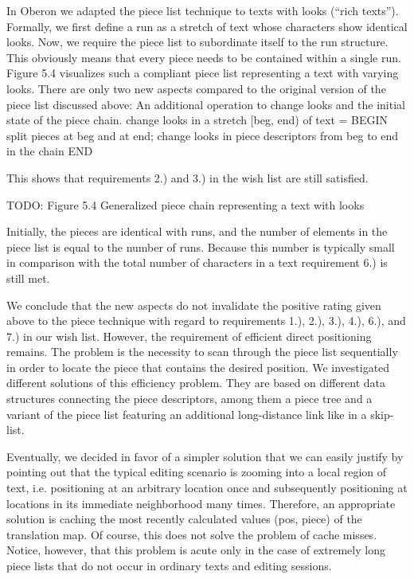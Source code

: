In Oberon we adapted the piece list technique to texts with looks
(``rich texts''). Formally, we first define a run as a stretch of text
whose characters show identical looks. Now, we require the piece list
to subordinate itself to the run structure. This obviously means that
every piece needs to be contained within a single run. Figure 5.4
visualizes such a compliant piece list representing a text with
varying looks. There are only two new aspects compared to the original
version of the piece list discussed above: An additional operation to
change looks and the initial state of the piece chain.
\begintt
change looks in a stretch [beg, end) of text = BEGIN
  split pieces at beg and at end;
  change looks in piece descriptors from beg to end in the chain
END
\endtt

\noindent This shows that requirements 2.) and 3.) in the wish list are still satisfied.

TODO: Figure 5.4 Generalized piece chain representing a text with looks

Initially, the pieces are identical with runs, and the number of elements in the piece list is equal to the number of runs. Because this number is typically small in comparison with the total number of characters in a text requirement 6.) is still met.

We conclude that the new aspects do not invalidate the positive rating given above to the piece technique with regard to requirements 1.), 2.), 3.), 4.), 6.), and 7.) in our wish list. However, the requirement of efficient direct positioning remains. The problem is the necessity to scan through the piece list sequentially in order to locate the piece that contains the desired position. We investigated different solutions of this efficiency problem. They are based on different data structures connecting the piece descriptors, among them a piece tree and a variant of the piece list featuring an additional long-distance link like in a skip-list.

Eventually, we decided in favor of a simpler solution that we can easily justify by pointing out that the typical editing scenario is zooming into a local region of text, i.e. positioning at an arbitrary location once and subsequently positioning at locations in its immediate neighborhood many times. Therefore, an appropriate solution is caching the most recently calculated values (pos, piece) of the translation map. Of course, this does not solve the problem of cache misses. Notice, however, that this problem is acute only in the case of extremely long piece lists that do not occur in ordinary texts and editing sessions.

